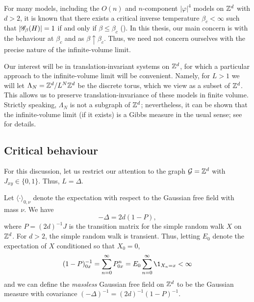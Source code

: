 For many models, including the $O(n)$ and $n$-component $|\varphi|^4$ models on ${ {{\mathbb Z}}^d }$ with $d > 2$, it is known that there exists a critical inverse temperature $\beta_c < \infty$ such that
$|\mathscr{G}_\beta(H)| = 1$ if and only if $\beta \le \beta_c$ (\REF). In this thesis, our main concern is with the behaviour at $\beta_c$ and as
$\beta \uparrow \beta_c$. Thus, we need not concern ourselves with the precise nature of the infinite-volume limit.

\begin{rk}
Our interest will be in translation-invariant systems on ${ {{\mathbb Z}}^d }$, for which a particular approach to the infinite-volume limit will be convenient. Namely, for $L > 1$ we will let $\Lambda_N = { {{\mathbb Z}}^d }/L^N{ {{\mathbb Z}}^d }$ be the discrete torus, which we view as a subset of ${ {{\mathbb Z}}^d }$. This allows us to preserve
translation-invariance of these models in finite volume. Strictly speaking, $\Lambda_N$ is not a subgraph of ${ {{\mathbb Z}}^d }$; nevertheless, it can be shown that the infinite-volume limit (if it exists) is a Gibbs measure in the usual sense; see \cite[Example 4.20]{Georgii11} for details.
\end{rk}


\subsection{Critical behaviour}

For this discussion, let us restrict our attention to the graph $\mathcal{G} = { {{\mathbb Z}}^d }$
with $J_{xy} \in \{ 0, 1 \}$. Thus, $L = \Delta$.

\begin{example}
Let $\langle \cdot \rangle_{0,\nu}$ denote the expectation with respect to the
Gaussian free field with mass $\nu$. We have
\begin{equation}
-\Delta = 2 d (1 - P),
\end{equation}
where $P = (2 d)^{-1} J$ is the transition matrix for the simple random walk $X$ on ${ {{\mathbb Z}}^d }$.
For $d > 2$, the simple random walk is transient. Thus, letting $E_0$ denote the expectation
of $X$ conditioned so that $X_0 = 0$,
\begin{equation}
(1 - P)^{-1}_{0x} = \sum_{n=0}^\infty P^n_{0x} = E_0 \sum_{n=0}^\infty \1_{X_n=x} < \infty
\end{equation}
and we can define the \emph{massless} Gaussian free field on ${ {{\mathbb Z}}^d }$ to be the Gaussian
measure with covariance $(-\Delta)^{-1} = (2 d)^{-1} (1 - P)^{-1}$.


\end{example}

